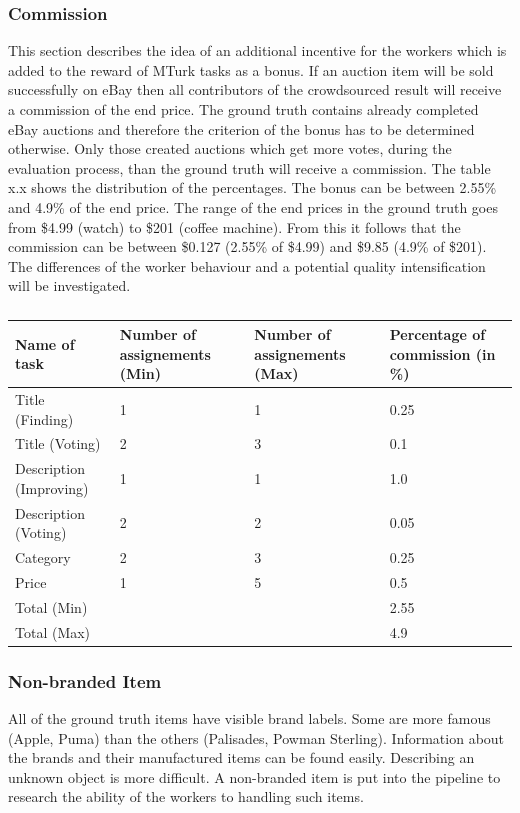\subsubsection{Commission}
This section describes the idea of an additional incentive for the workers which is added to the reward of MTurk tasks as a bonus. If an auction item will be sold successfully on eBay then all contributors of the crowdsourced result will receive a commission of the end price. The ground truth contains already completed eBay auctions and therefore the criterion of the bonus has to be determined otherwise. Only those created auctions which get more votes, during the evaluation process, than the ground truth will receive a commission. The table x.x shows the distribution of the percentages. The bonus can be between 2.55\% and 4.9\% of the end price. The range of the end prices in the ground truth goes from \$4.99 (watch) to \$201 (coffee machine). From this it follows that the commission can be between \$0.127 (2.55\% of \$4.99) and \$9.85 (4.9\% of \$201). The differences of the worker behaviour and a potential quality intensification will be investigated. 
\begin{table}[h!]
	\begin{center}
	\begin{tabular}{| l | l | l | p{10cm} |}
		\hline
		Name of task & Number of assignements (Min) & Number of assignements (Max) & Percentage of commission (in \%) \\
		\hline
		Title (Finding) & 1 & 1 & 0.25 \\
		\hline
		Title (Voting) & 2 & 3 & 0.1 \\
		\hline
		Description (Improving) & 1 & 1 & 1.0 \\
		\hline
		Description (Voting) & 2 & 2 & 0.05 \\
		\hline
		Category & 2 & 3 & 0.25 \\
		\hline
		Price & 1 & 5 & 0.5 \\
		\hline
		Total (Min) & & & 2.55 \\
		\hline
		Total (Max) & & & 4.9 \\
		\hline
	\end{tabular}
	\end{center}
	\caption{}
\end{table}

\subsubsection{Non-branded Item}
All of the ground truth items have visible brand labels. Some are more famous (Apple, Puma) than the others (Palisades, Powman Sterling). Information about the brands and their manufactured items can be found easily. Describing an unknown object is more difficult. A non-branded item is put into the pipeline to research the ability of the workers to handling such items. 

